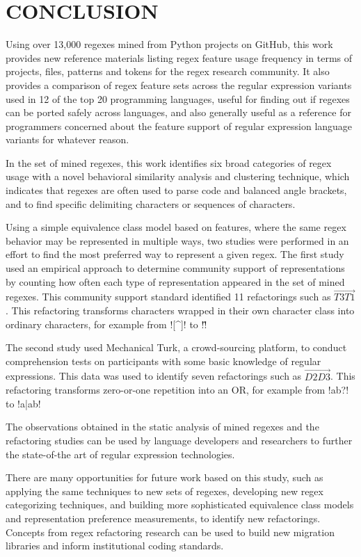 \chapter{CONCLUSION}
\label{ch7}

Using over 13,000 regexes mined from Python projects on GitHub, this work provides new reference materials listing regex feature usage frequency in terms of projects, files, patterns and tokens for the regex research community.  It also provides a comparison of regex feature sets across the regular expression variants used in 12 of the top 20 programming languages, useful for finding out if regexes can be ported safely across languages, and also generally useful as a reference for programmers concerned about the feature support of regular expression language variants for whatever reason.

In the set of mined regexes, this work identifies six broad categories of regex usage with a novel behavioral similarity analysis and clustering technique, which indicates that regexes are often used to parse code and balanced angle brackets, and to find specific delimiting characters or sequences of characters.

Using a simple equivalence class model based on features, where the same regex behavior may be represented in multiple ways, two studies were performed in an effort to find the most preferred way to represent a given regex.  The first study used an empirical approach to determine community support of representations by counting how often each type of representation appeared in the set of mined regexes.  This community support standard identified 11 refactorings such as $\overrightarrow{T3 T1}$.  This refactoring transforms characters wrapped in their own character class into ordinary characters, for example from \cverb![^]! to \cverb!\^!

The second study used Mechanical Turk, a crowd-sourcing platform, to conduct comprehension tests on participants with some basic knowledge of regular expressions.  This data was used to identify seven refactorings such as $\overrightarrow{D2 D3}$.  This refactoring transforms zero-or-one repetition into an OR, for example from \cverb!ab?! to \cverb!a|ab!

The observations obtained in the static analysis of mined regexes and the refactoring studies can be used by language developers and researchers to further the state-of-the art of regular expression technologies.

There are many opportunities for future work based on this study, such as applying the same techniques to new sets of regexes, developing new regex categorizing techniques, and building more sophisticated equivalence class models and representation preference measurements, to identify new refactorings.  Concepts from regex refactoring research can be used to build new migration libraries and inform institutional coding standards.
